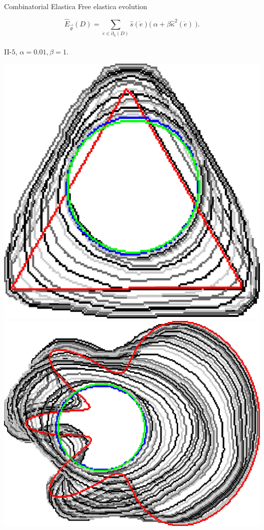 \begin{frame}
	{Combinatorial Elastica}	
	{Free elastica evolution}

\begin{center}
{\footnotesize
\[
\hat{E}_{\vec{\theta}}(D) = \sum_{\dot{e} \in \partial_h(D)}{\hat{s}(\dot{e}) \Big(\: \alpha + \beta \hat{\kappa}^2(\dot{e}) \: \Big). }\]
}\\

II-$5$, $\alpha=0.01, \beta=1.$
\end{center}
\begin{minipage}{0.49\textwidth}
\center
\includegraphics[scale=0.15]{figures/combinatorial-elastica/flow/ii/elastica/len_pen_0.01000/jonctions_1/curve_segs_4/best/gs_0.25000/triangle.png}\\[1em]
\includegraphics[scale=0.18]{figures/combinatorial-elastica/flow/ii/elastica/len_pen_0.01000/jonctions_1/curve_segs_4/best/gs_0.25000/flower.png}

\end{minipage}
\end{frame}
